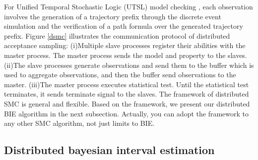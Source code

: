 \begin{figure}[htbp]
\end{figure}

For Unified Temporal Stochastic Logic (UTSL) model checking \cite{Younes2004Planning}, each observation involves the generation of a trajectory prefix through the discrete event simulation and the verification of a path formula over the generated trajectory prefix. Figure \ref{dsmc} illustrates the communication protocol of distributed acceptance sampling: (i)Multiple slave processes register their abilities with the master process. The master process sends the model and property to the slaves. (ii)The slave processes generate observations and send them to the buffer which is used to aggregate observations, and then the buffer send observations to the master. (iii)The master process executes statistical test. Until the statistical test terminates, it sends terminate signal to the slaves. The framework of distributed SMC is general and flexible. Based on the framework, we present our distributed BIE algorithm in the next subsection. Actually, you can adopt the framework to any other SMC algorithm, not just limits to BIE.

\subsection{Distributed bayesian interval estimation}

